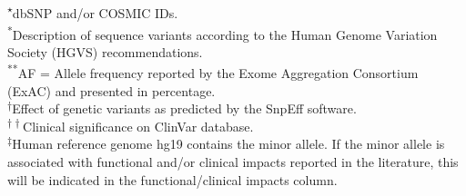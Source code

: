 \begin{landscape}
\newpage
\noindent\textsuperscript{$\star$}dbSNP and/or COSMIC IDs.
\\
\textsuperscript{*}Description of sequence variants according to the Human Genome Variation Society (HGVS) recommendations.
\\
\textsuperscript{**}AF = Allele frequency reported by the Exome Aggregation Consortium (ExAC) and presented in percentage.
\\
\textsuperscript{$\dagger$}Effect of genetic variants as predicted by the SnpEff software.
\\
\textsuperscript{$\dagger\dagger$}Clinical significance on ClinVar database.
\\
\textsuperscript{$\ddagger$}Human reference genome hg19 contains the minor allele. If the minor allele is associated with functional and/or clinical impacts reported in the literature, this will be indicated in the functional/clinical impacts column.

\end{landscape}


